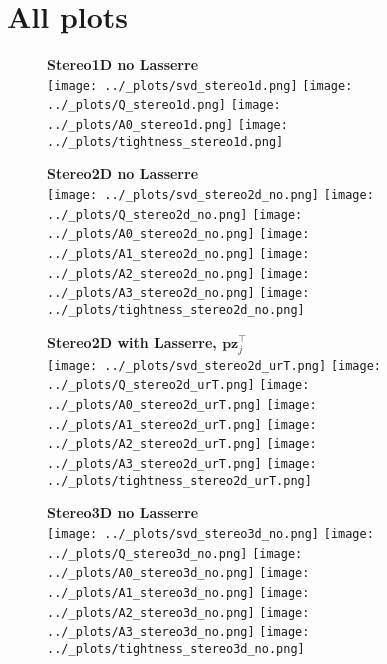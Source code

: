 \documentclass[11pt]{article}
\newcommand{\vc}[1]{\ensuremath{\bm{#1}}}
\begin{document}
\clearpage
\FloatBarrier
\section{All plots}

\begin{figure}[h!]
  \centering
  \textbf{\large{Stereo1D no Lasserre}} \\
  \vspace{2em}
  \texttt{[image: ../\_plots/svd\_stereo1d.png]}
  \texttt{[image: ../\_plots/Q\_stereo1d.png]}
  \texttt{[image: ../\_plots/A0\_stereo1d.png]}
  \texttt{[image: ../\_plots/tightness\_stereo1d.png]}
  \label{fig:noise}
\end{figure}

\begin{figure}[h!]
  \centering
  \textbf{\large{Stereo2D no Lasserre}} \\
  \vspace{2em}
  \texttt{[image: ../\_plots/svd\_stereo2d\_no.png]}
  \texttt{[image: ../\_plots/Q\_stereo2d\_no.png]}
  \texttt{[image: ../\_plots/A0\_stereo2d\_no.png]}
  \texttt{[image: ../\_plots/A1\_stereo2d\_no.png]}
  \texttt{[image: ../\_plots/A2\_stereo2d\_no.png]}
  \texttt{[image: ../\_plots/A3\_stereo2d\_no.png]}
  \texttt{[image: ../\_plots/tightness\_stereo2d\_no.png]}
  \label{fig:noise}
\end{figure}

\begin{figure}[h]
  \centering
\textbf{\large{Stereo2D with Lasserre, $\vc{p}\vc{z}_j^\top$}} \\
  \vspace{2em}
  \texttt{[image: ../\_plots/svd\_stereo2d\_urT.png]}
  \texttt{[image: ../\_plots/Q\_stereo2d\_urT.png]}
  \texttt{[image: ../\_plots/A0\_stereo2d\_urT.png]}
  \texttt{[image: ../\_plots/A1\_stereo2d\_urT.png]}
  \texttt{[image: ../\_plots/A2\_stereo2d\_urT.png]}
  \texttt{[image: ../\_plots/A3\_stereo2d\_urT.png]}
  \texttt{[image: ../\_plots/tightness\_stereo2d\_urT.png]}
  \label{fig:noise}
\end{figure}


\begin{figure}[h]
  \centering
  \textbf{\large{Stereo3D no Lasserre}} \\
  \vspace{2em}
  \texttt{[image: ../\_plots/svd\_stereo3d\_no.png]}
  \texttt{[image: ../\_plots/Q\_stereo3d\_no.png]}
  \texttt{[image: ../\_plots/A0\_stereo3d\_no.png]}
  \texttt{[image: ../\_plots/A1\_stereo3d\_no.png]}
  \texttt{[image: ../\_plots/A2\_stereo3d\_no.png]}
  \texttt{[image: ../\_plots/A3\_stereo3d\_no.png]}
  \texttt{[image: ../\_plots/tightness\_stereo3d\_no.png]}
  \label{fig:noise}
\end{figure}
\end{document}
